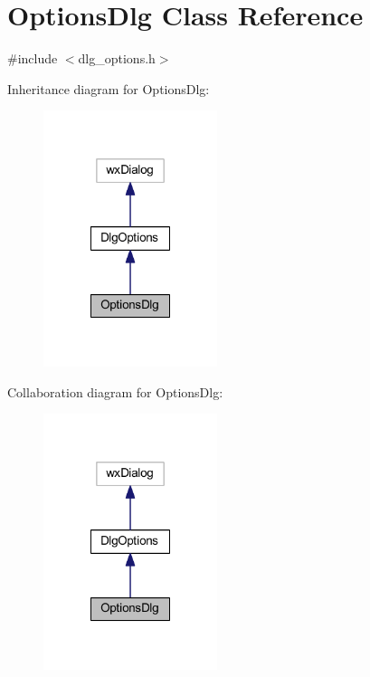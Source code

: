 \hypertarget{class_options_dlg}{\section{Options\-Dlg Class Reference}
\label{class_options_dlg}
}


{\ttfamily \#include $<$dlg\-\_\-options.\-h$>$}



Inheritance diagram for Options\-Dlg\-:\nopagebreak
\begin{figure}[H]
\begin{center}
\leavevmode
\includegraphics[width=144pt]{class_options_dlg__inherit__graph}
\end{center}
\end{figure}


Collaboration diagram for Options\-Dlg\-:\nopagebreak
\begin{figure}[H]
\begin{center}
\leavevmode
\includegraphics[width=144pt]{class_options_dlg__coll__graph}
\end{center}
\end{figure}
